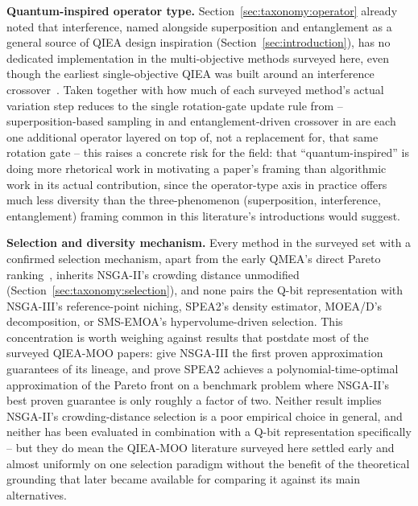 \textbf{Quantum-inspired operator type.} Section~\ref{sec:taxonomy:operator}
already noted that interference, named alongside superposition and
entanglement as a general source of QIEA design inspiration
(Section~\ref{sec:introduction}), has no dedicated implementation in the
multi-objective methods surveyed here, even though the earliest
single-objective QIEA was built around an interference
crossover~\citep{narayanan1996qiga}. Taken together with how much of each surveyed
method's actual variation step reduces to the single rotation-gate
update rule from \citet{han2002qea} -- superposition-based sampling in
\citet{guzel2022qnsga2} and entanglement-driven crossover in
\citet{kumar2026eahqnsga2} are each one additional operator layered on
top of, not a replacement for, that same rotation gate -- this raises a
concrete risk for the field: that ``quantum-inspired'' is doing more
rhetorical work in motivating a paper's framing than algorithmic work in
its actual contribution, since the operator-type axis in practice offers
much less diversity than the three-phenomenon (superposition,
interference, entanglement) framing common in this literature's
introductions would suggest.

\textbf{Selection and diversity mechanism.} Every method in the
surveyed set with a confirmed selection mechanism, apart from the early
QMEA's direct Pareto ranking~\citep{kim2006qmea}, inherits NSGA-II's
crowding distance unmodified
(Section~\ref{sec:taxonomy:selection}), and none pairs the Q-bit
representation with NSGA-III's reference-point niching, SPEA2's
density estimator, MOEA/D's decomposition, or SMS-EMOA's
hypervolume-driven selection. This concentration is worth weighing
against results that postdate most of the surveyed
QIEA-MOO papers: \citet{deng2025nsga3guarantees} give NSGA-III the first
proven approximation guarantees of its lineage, and
\citet{alghouass2025spea2beatsnsga2} prove SPEA2 achieves a
polynomial-time-optimal approximation of the Pareto front on a
benchmark problem where NSGA-II's best proven guarantee is only
roughly a factor of two. Neither result implies NSGA-II's
crowding-distance selection is a poor empirical choice in general, and
neither has been evaluated in combination with a Q-bit representation
specifically -- but they do mean the QIEA-MOO literature surveyed here
settled early and almost uniformly on one selection paradigm without the
benefit of the theoretical grounding that later became available for
comparing it against its main alternatives.

